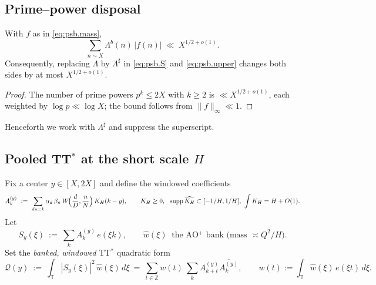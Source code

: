 \subsection{Prime–power disposal}\label{subsec:psb.pp}

\begin{lemma}\label{lem:psb.pp}
With $f$ as in \eqref{eq:psb.mass},
\[
\sum_{n\sim X} \Lambda^b(n)\,|f(n)|\ \ll\ X^{1/2+o(1)}.
\]
Consequently, replacing $\Lambda$ by $\Lambda^\sharp$ in \eqref{eq:psb.S} and \eqref{eq:psb.upper} changes both sides by at most $X^{1/2+o(1)}$.
\end{lemma}

\begin{proof}
The number of prime powers $p^k\le 2X$ with $k\ge2$ is $\ll X^{1/2+o(1)}$, each weighted by $\log p\ll\log X$; the bound follows from $\|f\|_\infty\ll1$.
\end{proof}

Henceforth we work with $\Lambda^\sharp$ and suppress the superscript.

\subsection*{Pooled TT$^\ast$ at the short scale $H$}

Fix a center $y\in[X,2X]$ and define the windowed coefficients
\[
A_k^{(y)}\ :=\ \sum_{dn=k} \alpha_d\,\beta_n\,W\!\Big(\frac dD,\frac nN\Big)\,K_H(k-y),
\qquad K_H\ge 0,\ \ \operatorname{supp} \widehat{K_H}\subset[-1/H,1/H],\ \int K_H = H+O(1).
\]
Let
\[
S_y(\xi)\ :=\ \sum_{k} A_k^{(y)}\,e(\xi k),\qquad 
\widehat w(\xi)\ \text{ the AO$^+$ bank (mass $\asymp Q^2/H$)}.
\]
Set the \emph{banked, windowed} TT$^\ast$ quadratic form
\[
\mathcal Q(y)\ :=\ \int_{\mathbb T} |S_y(\xi)|^2\,\widehat w(\xi)\,d\xi
\ =\ \sum_{t\in\mathbb Z} w(t)\ \sum_{k} A_{k+t}^{(y)}\overline{A_k^{(y)}},\qquad
w(t):=\int_{\mathbb T}\widehat w(\xi)\,e(\xi t)\,d\xi.
\]

